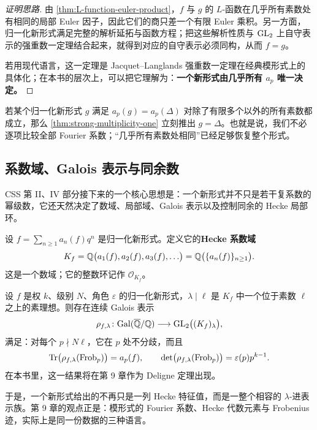 \begin{proof}[证明思路]
由 \cref{thm:L-function-euler-product}，$f$ 与 $g$ 的 $L$-函数在几乎所有素数处有相同的局部 Euler 因子，因此它们的商只差一个有限 Euler 乘积。另一方面，归一化新形式满足完整的解析延拓与函数方程；把这些解析性质与 $\mathrm{GL}_2$ 上自守表示的强重数一定理结合起来，就得到对应的自守表示必须同构，从而 $f=g$。

若用现代语言，这一定理是 Jacquet--Langlands 强重数一定理在经典模形式上的具体化；在本书的层次上，可以把它理解为：\textbf{一个新形式由几乎所有 $a_p$ 唯一决定。}
\end{proof}

\begin{example}[为什么这一定理如此强]
若某个归一化新形式 $g$ 满足 $a_p(g)=a_p(\Delta)$ 对除了有限多个以外的所有素数都成立，那么 \cref{thm:strong-multiplicity-one} 立刻推出 $g=\Delta$。也就是说，我们不必逐项比较全部 Fourier 系数；“几乎所有素数处相同”已经足够恢复整个形式。
\end{example}

\subsection*{系数域、Galois 表示与同余数}

CSS 第 II、IV 部分接下来的一个核心思想是：一个新形式并不只是若干复系数的幂级数，它还天然决定了数域、局部域、Galois 表示以及控制同余的 Hecke 局部环。

\begin{definition}
\label{def:hecke-field}
设 $f=\sum_{n\ge 1}a_n(f)q^n$ 是归一化新形式。定义它的\textbf{Hecke 系数域}
\[
  K_f=\mathbb{Q}\bigl(a_1(f),a_2(f),a_3(f),\ldots\bigr)=\mathbb{Q}\bigl(\{a_n(f)\}_{n\ge 1}\bigr).
\]
这是一个数域；它的整数环记作 $\mathcal{O}_{K_f}$。
\end{definition}

\begin{theorem}
\label{thm:deligne-preview}
设 $f$ 是权 $k$、级别 $N$、角色 $\varepsilon$ 的归一化新形式，$\lambda\mid \ell$ 是 $K_f$ 中一个位于素数 $\ell$ 之上的素理想。则存在连续 Galois 表示
\[
  \rho_{f,\lambda}\colon \mathrm{Gal}(\overline{\mathbb{Q}}/\mathbb{Q})
  \longrightarrow \mathrm{GL}_2\bigl((K_f)_\lambda\bigr),
\]
满足：对每个 $p\nmid N\ell$，它在 $p$ 处不分歧，而且
\[
  \mathrm{Tr}\bigl(\rho_{f,\lambda}(\mathrm{Frob}_p)\bigr)=a_p(f),
  \qquad
  \det\bigl(\rho_{f,\lambda}(\mathrm{Frob}_p)\bigr)=\varepsilon(p)p^{k-1}.
\]
在本书里，这一结果将在第 9 章作为 Deligne 定理出现。
\end{theorem}

于是，一个新形式给出的不再只是一列 Hecke 特征值，而是一整个相容的 $\lambda$-进表示族。第 9 章的观点正是：模形式的 Fourier 系数、Hecke 代数元素与 Frobenius 迹，实际上是同一份数据的三种语言。

